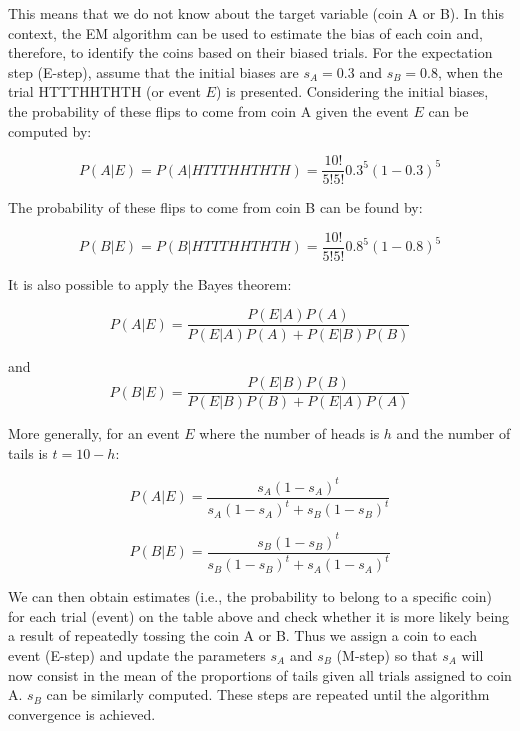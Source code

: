 This means that we do not know about the target variable (coin A or B). In this context, the EM algorithm can be used to estimate the bias of each coin and, therefore, to identify the coins based on their biased trials. For the expectation step (E-step), assume that the initial biases are $s_A = 0.3$ and $s_B = 0.8$, when the trial HTTTHHTHTH (or event $E$) is presented. Considering the initial biases, the probability of these flips to come from coin A given the event $E$ can be computed by:

\begin{equation}
    P(A|E) = P(A|HTTTHHTHTH) = \frac{10!}{5!5!}0.3^{5}(1 - 0.3)^{5}
\end{equation}

The probability of these flips to come from coin B can be found by:

\begin{equation}
    P(B|E) = P(B|HTTTHHTHTH) = \frac{10!}{5!5!}0.8^{5}(1 - 0.8)^{5}
\end{equation}

It is also possible to apply the Bayes theorem:

\begin{equation}
    P(A|E) = \frac{P(E|A)P(A)}{P(E|A)P(A) + P(E|B)P(B)}
\end{equation}

\noindent and
\begin{equation}
    P(B|E) = \frac{P(E|B)P(B)}{P(E|B)P(B) + P(E|A)P(A)}
\end{equation}

More generally, for an event $E$ where the number of heads is $h$ and the number of tails is $t = 10 - h$:

\begin{equation}
    P(A|E) = \frac{s_A(1-s_A)^t}{s_A(1-s_A)^t + s_B(1-s_B)^t}
\end{equation}

\begin{equation}
    P(B|E) = \frac{s_B(1-s_B)^t}{s_B(1-s_B)^t + s_A(1-s_A)^t}
\end{equation}


We can then obtain estimates (i.e., the probability to belong to a specific coin) for each trial (event) on the table above and check whether it is more likely being a result of repeatedly tossing the coin A or B. Thus we assign a coin to each event (E-step) and update the parameters $s_A$ and $s_B$ (M-step) so that $s_A$ will now consist in the mean of the proportions of tails given all trials assigned to coin A. $s_B$ can be similarly computed. These steps are repeated until the algorithm convergence is achieved.

